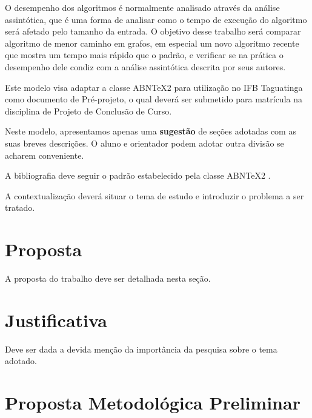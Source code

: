 \documentclass[bacharelado]{pre-projeto-computacao}
\begin{document}
  O desempenho dos algoritmos é normalmente analisado através da análise assintótica, que é uma forma de analisar como o tempo de execução do algoritmo será afetado pelo tamanho da entrada. O objetivo desse trabalho será comparar algoritmo de menor caminho em grafos, em especial um novo algoritmo recente que mostra um tempo mais rápido que o padrão, e verificar se na prática o desempenho dele condiz com a análise assintótica descrita por seus autores.

	Este modelo visa adaptar a classe ABNTeX2 para utilização no IFB Taguatinga como documento de Pré-projeto, o qual deverá ser submetido para matrícula na disciplina de Projeto de Conclusão de Curso.
	
	Neste modelo, apresentamos apenas uma \textbf{sugestão} de seções adotadas com as suas breves descrições. O aluno e orientador podem adotar outra divisão se acharem conveniente.
	
	A bibliografia deve seguir o padrão estabelecido pela classe ABNTeX2 \cite{abntex2modelo-relatorio}.
	
	A contextualização deverá situar o tema de estudo e introduzir o problema a ser tratado.

\section*{Proposta}
	A proposta do trabalho deve ser detalhada nesta seção.

\section*{Justificativa}
	Deve ser dada a devida menção da importância da pesquisa sobre o tema adotado.	

\section*{Proposta Metodológica Preliminar}


\end{document}
